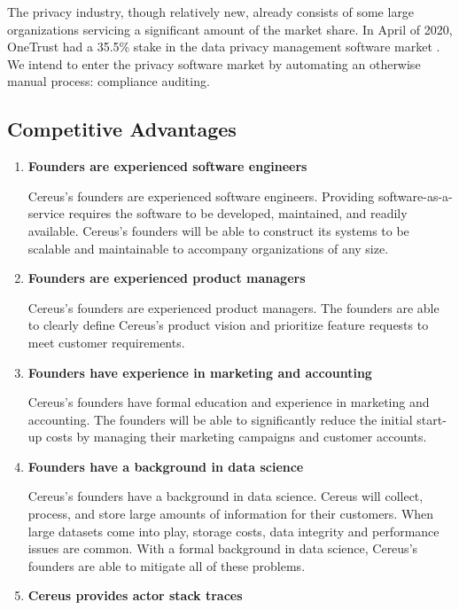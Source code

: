 The privacy industry, though relatively new, already consists of some large organizations servicing a significant amount of the market share. In April of 2020, OneTrust had a 35.5\% stake in the data privacy management software market \cite{onetrust.2020}. We intend to enter the privacy software market by automating an otherwise manual process: compliance auditing.

\subsection{Competitive Advantages}

\begin{enumerate}
  \item \textbf{Founders are experienced software engineers}
  
  Cereus's founders are experienced software engineers. Providing software-as-a-service requires the software to be developed, maintained, and readily available. Cereus's founders will be able to construct its systems to be scalable and maintainable to accompany organizations of any size.
  
  \item \textbf{Founders are experienced product managers}

  Cereus's founders are experienced product managers. The founders are able to clearly define Cereus's product vision and prioritize feature requests to meet customer requirements.

  \item \textbf{Founders have experience in marketing and accounting}

  Cereus's founders have formal education and experience in marketing and accounting. The founders will be able to significantly reduce the initial start-up costs by managing their marketing campaigns and customer accounts.

  \item \textbf{Founders have a background in data science}

  Cereus's founders have a background in data science. Cereus will collect, process, and store large amounts of information for their customers. When large datasets come into play, storage costs, data integrity and performance issues are common. With a formal background in data science, Cereus's founders are able to mitigate all of these problems.

  \item \textbf{Cereus provides actor stack traces}


\end{enumerate}
